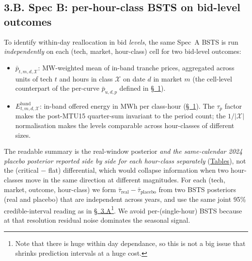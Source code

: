 \documentclass[11pt]{article}
\begin{document}
\subsection*{3.B. Spec B: per-hour-class BSTS on bid-level outcomes}\label{sec:smart_desc}
To identify within-day reallocation in bid \emph{levels}, the same Spec~A BSTS is run \emph{independently} on each (tech, market, hour-class) cell for two bid-level outcomes:
\begin{itemize}\setlength{\itemsep}{1pt}
  \item $\bar p_{t,m,d,\mathcal{X}}$: MW-weighted mean of in-band tranche prices, aggregated across units of tech $t$ and hours in class $\mathcal{X}$ on date $d$ in market $m$ (the cell-level counterpart of the per-curve $\bar p_{u,d,p}$ defined in \hyperref[sec:setup]{\S~1}).
  \item $E^{\text{band}}_{t,m,d,\mathcal{X}}$: in-band offered energy in MWh per class-hour (\hyperref[sec:setup]{\S~1}). The $\tau_p$ factor makes the post-MTU15 quarter-sum invariant to the period count; the $1/|\mathcal{X}|$ normalisation makes the levels comparable across hour-classes of different sizes.
\end{itemize}
The readable summary is the real-window posterior \emph{and the same-calendar 2024 placebo posterior reported side by side for each hour-class separately} (\hyperref[tab:specB-id15]{Tables}), not the (critical $-$ flat) differential, which would collapse information when two hour-classes move in the same direction at different magnitudes. For each (tech, market, outcome, hour-class) we form $\bar\tau_{\text{real}} - \bar\tau_{\text{placebo}}$ from two BSTS posteriors (real and placebo) that are independent across years, and use the same joint 95\% credible-interval reading as in \hyperref[sec:bsts]{\S~3.A}\footnote{Note that there is huge within day dependance, so this is not a big issue that shrinks prediction intervals at a huge cost.}. We avoid per-(single-hour) BSTS because at that resolution residual noise dominates the seasonal signal.
\end{document}
